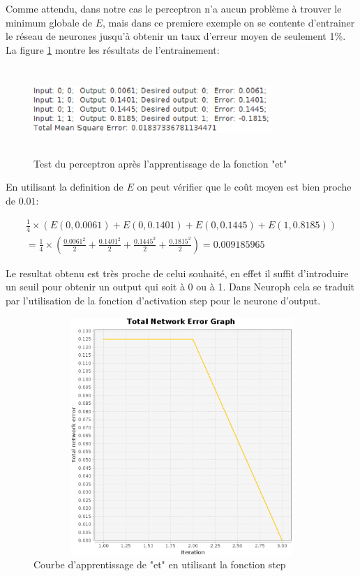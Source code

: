 \documentclass[twoside,openright,a4paper,11pt,french]{article}
\begin{document}
Comme attendu, dans notre cas le perceptron n'a aucun problème à trouver le
minimum globale de $E$, mais dans ce premiere exemple on se contente d'entrainer le
réseau de neurones jusqu'à obtenir un taux d'erreur moyen de seulement 1\%. La
figure \ref{fig:andtest1} montre les résultats de l'entrainement:

\begin{figure}[ht]
\centering
\includegraphics[width=9cm,height=3.3cm]{./pics/andtest1.eps}
\caption{Test du perceptron après l'apprentissage de la fonction "et"}
\label{fig:andtest1}
\end{figure}

En utilisant la definition de $E$ on peut vérifier que le coût
moyen est bien proche de $0.01$:

\vspace{1.1cm}

\begin{equation*}
  \begin{aligned}
  \tfrac{1}{4}\times(E(0,0.0061)+E(0,0.1401)+E(0,0.1445)+E(1,0.8185))\\
  = \tfrac{1}{4}\times(\tfrac{0.0061^2}{2}+\tfrac{0.1401^2}{2}+\tfrac{0.1445^2}{2}+\tfrac{0.1815^2}{2}) =
  0.009185965
  \end{aligned}
\end{equation*}

\vspace{1.3cm}

Le resultat obtenu est très proche de celui souhaité, en effet il suffit 
d'introduire un seuil pour obtenir un output qui soit à 0 ou à 1.
Dans Neuroph cela se traduit par l'utilisation de la fonction d'activation step pour le
neurone d'output.


\clearpage
\begin{figure}[ht]
\centering
\includegraphics[width=12cm,height=9cm]{./pics/and_error2.eps}
\caption{Courbe d'apprentissage de "et" en utilisant la fonction step}
\label{fig:anderr1}
\end{figure}
\end{document}
